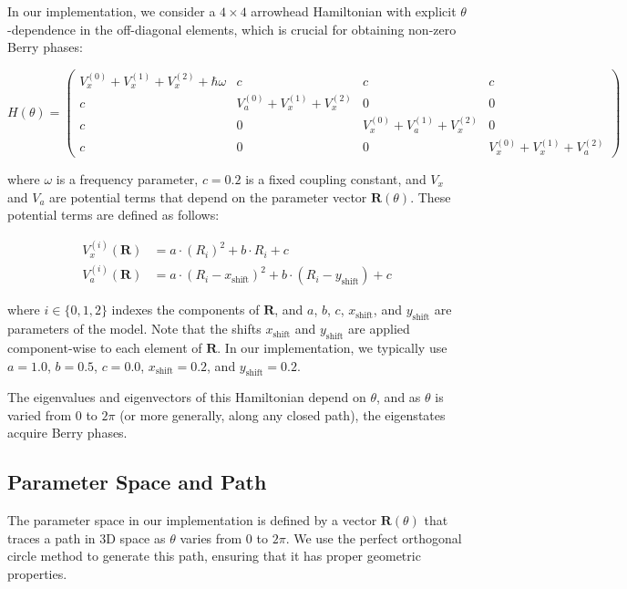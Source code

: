 \documentclass[12pt,a4paper]{article}
\begin{document}
In our implementation, we consider a $4 \times 4$ arrowhead Hamiltonian with explicit $\theta$-dependence in the off-diagonal elements, which is crucial for obtaining non-zero Berry phases:

\begin{equation}
H(\theta) = \begin{pmatrix}
\scriptstyle V_x^{(0)} + V_x^{(1)} + V_x^{(2)} + \hbar\omega & \scriptstyle c & \scriptstyle c & \scriptstyle c \\
\scriptstyle c & \scriptstyle V_a^{(0)} + V_x^{(1)} + V_x^{(2)} & \scriptstyle 0 & \scriptstyle 0 \\
\scriptstyle c & \scriptstyle 0 & \scriptstyle V_x^{(0)} + V_a^{(1)} + V_x^{(2)} & \scriptstyle 0 \\
\scriptstyle c & \scriptstyle 0 & \scriptstyle 0 & \scriptstyle V_x^{(0)} + V_x^{(1)} + V_a^{(2)}
\end{pmatrix}
\end{equation}

where $\omega$ is a frequency parameter, $c = 0.2$ is a fixed coupling constant, and $V_x$ and $V_a$ are potential terms that depend on the parameter vector $\bm{R}(\theta)$. These potential terms are defined as follows:

\begin{align}
V_x^{(i)}(\bm{R}) &= a \cdot (R_i)^2 + b \cdot R_i + c \\
V_a^{(i)}(\bm{R}) &= a \cdot (R_i - x_{\text{shift}})^2 + b \cdot (R_i - y_{\text{shift}}) + c
\end{align}

where $i \in \{0, 1, 2\}$ indexes the components of $\bm{R}$, and $a$, $b$, $c$, $x_{\text{shift}}$, and $y_{\text{shift}}$ are parameters of the model. Note that the shifts $x_{\text{shift}}$ and $y_{\text{shift}}$ are applied component-wise to each element of $\bm{R}$. In our implementation, we typically use $a = 1.0$, $b = 0.5$, $c = 0.0$, $x_{\text{shift}} = 0.2$, and $y_{\text{shift}} = 0.2$.

The eigenvalues and eigenvectors of this Hamiltonian depend on $\theta$, and as $\theta$ is varied from $0$ to $2\pi$ (or more generally, along any closed path), the eigenstates acquire Berry phases.

\subsection{Parameter Space and Path}

The parameter space in our implementation is defined by a vector $\bm{R}(\theta)$ that traces a path in 3D space as $\theta$ varies from 0 to $2\pi$. We use the perfect orthogonal circle method to generate this path, ensuring that it has proper geometric properties.
\end{document}
